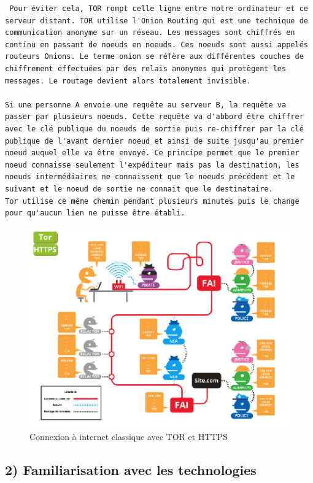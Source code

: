\documentclass[]{article}
\begin{document}
\begin{verbatim}
 Pour éviter cela, TOR rompt celle ligne entre notre ordinateur et ce serveur distant. TOR utilise l'Onion Routing qui est une technique de communication anonyme sur un réseau. Les messages sont chiffrés en continu en passant de noeuds en noeuds. Ces noeuds sont aussi appelés routeurs Onions. Le terme onion se réfère aux différentes couches de chiffrement effectuées par des relais anonymes qui protègent les messages. Le routage devient alors totalement invisible.

Si une personne A envoie une requête au serveur B, la requête va passer par plusieurs noeuds. Cette requête va d'abbord être chiffrer avec le clé publique du noeuds de sortie puis re-chiffrer par la clé publique de l'avant dernier noeud et ainsi de suite jusqu'au premier noeud auquel elle va être envoyé. Ce principe permet que le premier noeud connaisse seulement l'expéditeur mais pas la destination, les noeuds intermédiaires ne connaissent que le noeuds précédent et le suivant et le noeud de sortie ne connait que le destinataire.
Tor utilise ce même chemin pendant plusieurs minutes puis le change pour qu'aucun lien ne puisse être établi.
\end{verbatim}

\begin{figure}
\centering
\includegraphics{images/connexion_tor.png}
\caption{Connexion à internet classique avec TOR et HTTPS}
\end{figure}

\subsection{2) Familiarisation avec les
technologies}\label{familiarisation-avec-les-technologies}
\end{document}
